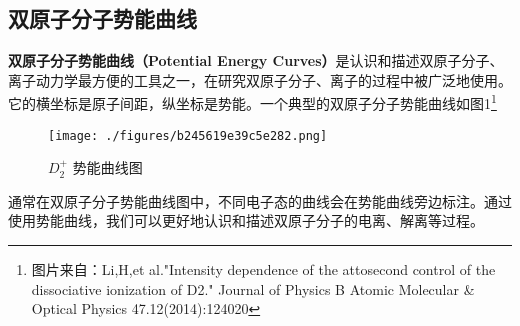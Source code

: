 
\begin{issues}
\issueDraft
\end{issues}

\subsection{双原子分子势能曲线}
\textbf{双原子分子势能曲线（Potential Energy Curves）}是认识和描述双原子分子、离子动力学最方便的工具之一，在研究双原子分子、离子的过程中被广泛地使用。
它的横坐标是原子间距，纵坐标是势能。一个典型的双原子分子势能曲线如图1\footnote{图片来自：Li,H,et al."Intensity dependence of the attosecond control of the dissociative ionization of D2." Journal of Physics B Atomic Molecular \& Optical Physics 47.12(2014):124020}

\begin{figure}[ht]
\centering
\texttt{[image: ./figures/b245619e39c5e282.png]}
\caption{$D_2^+$ 势能曲线图} \label{fig_dpecs_1}
\end{figure}
通常在双原子分子势能曲线图中，不同电子态的曲线会在势能曲线旁边标注。通过使用势能曲线，我们可以更好地认识和描述双原子分子的电离、解离等过程。
